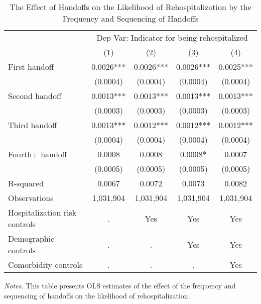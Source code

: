 \documentclass[final,12pt, notitlepage]{article}
\begin{document}
\begin{singlespace}
\begin{table}[H]
\footnotesize
\setlength\tabcolsep{0pt}
\centering
\caption{The Effect of Handoffs on the Likelihood of Rehospitalization by the Frequency and Sequencing of Handoffs}
\label{tab:ols_mechanism}
\begin{threeparttable}
\begin{tabular*}{\textwidth}{l@{\extracolsep{\fill}}*{4}{c}}
\toprule
& \multicolumn{4}{c}{Dep Var: Indicator for being rehospitalized} \\
 & (1) & (2) & (3) & (4) \\
\midrule
First handoff & 0.0026*** & 0.0026*** & 0.0026*** & 0.0025*** \\
 & (0.0004) & (0.0004) & (0.0004) & (0.0004) \\
Second handoff & 0.0013*** & 0.0013*** & 0.0013*** & 0.0013*** \\
 & (0.0003) & (0.0003) & (0.0003) & (0.0003) \\
Third handoff & 0.0013*** & 0.0012*** & 0.0012*** & 0.0012*** \\
 & (0.0004) & (0.0004) & (0.0004) & (0.0004) \\
Fourth+ handoff & 0.0008 & 0.0008 & 0.0008* & 0.0007 \\
 & (0.0005) & (0.0005) & (0.0005) & (0.0005) \\
R-squared & 0.0067 & 0.0072 & 0.0073 & 0.0082 \\
\midrule
Observations & 1,031,904 & 1,031,904 & 1,031,904 & 1,031,904 \\
Hospitalization risk controls & . & Yes & Yes & Yes \\
Demographic controls & . & . & Yes & Yes \\
 Comorbidity controls & . & . & . & Yes \\
\bottomrule
\end{tabular*}
	\begin{tablenotes}
	\scriptsize
	\item \emph{Notes.} This table presents OLS estimates of the effect of the frequency and sequencing of handoffs on the likelihood of rehospitalization.


\end{tablenotes}
\end{threeparttable}
\end{table}
\end{singlespace}
\end{document}
